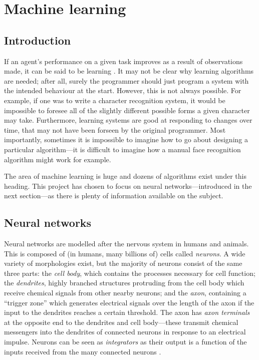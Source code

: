 \section{Machine learning}

\subsection{Introduction}

If an agent's performance on a given task improves as a result of observations made, it can be said to be learning \cite[p. 693]{RussellNorvig}.  It may not be clear why learning algorithms are needed; after all, surely the programmer should just program a system with the intended behaviour at the start.  However, this is not always possible.  For example, if one was to write a character recognition system, it would be impossible to foresee all of the slightly different possible forms a given character may take.  Furthermore, learning systems are good at responding to changes over time, that may not have been forseen by the original programmer.  Most importantly, sometimes it is impossible to imagine how to go about designing a particular algorithm---it is difficult to imagine how a manual face recognition algorithm might work for example.

The area of machine learning is huge and dozens of algorithms exist under this heading.  This project has chosen to focus on neural networks---introduced in the next section---as there is plenty of information available on the subject.

\subsection{Neural networks}

Neural networks are modelled after the nervous system in humans and animals.  This is composed of (in humans, many billions of) cells called \emph{neurons}.  A wide variety of morphologies exist, but the majority of neurons consist of the same three parts: the \emph{cell body}, which contains the processes necessary for cell function; the \emph{dendrites}, highly branched structures protruding from the cell body which receive chemical signals from other nearby neurons; and the \emph{axon}, containing a ``trigger zone'' which generates electrical signals over the length of the axon if the input to the dendrites reaches a certain threshold.  The axon has \emph{axon terminals} at the opposite end to the dendrites and cell body---these transmit chemical messengers into the dendrites of connected neurons in response to an electrical impulse.  Neurons can be seen as \emph{integrators} as their output is a function of the inputs received from the many connected neurons \cite[p. 152]{Vander}.

